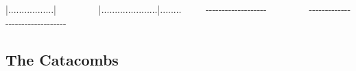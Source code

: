 \allowbreak{}|.................\allowbreak{}|{\mbox{$~$}}{\mbox{$~$}}{\mbox{$~$}}{\mbox{$~$}}{\mbox{$~$}}{\mbox{$~$}}{\mbox{$~$}}{\mbox{$~$}}{\mbox{$~$}}{\mbox{$~$}}{\mbox{$~$}}{\mbox{$~$}}{\mbox{$~$}}{\mbox{$~$}}{\mbox{$~$}}{\mbox{$~$}}{\mbox{$~$}}{\mbox{$~$}}{\mbox{$~$}}{\mbox{$~$}}\allowbreak{}|.....................\allowbreak{}|........{\mbox{$~$}}{\mbox{$~$}}{\mbox{$~$}}{\mbox{$~$}}{\mbox{$~$}}{\mbox{$~$}}{\mbox{$~$}}$\text{ }$\newline{}
-{}-{}-{}-{}-{}-{}-{}-{}-{}-{}-{}-{}-{}-{}-{}-{}-{}-{}-{}{\mbox{$~$}}{\mbox{$~$}}{\mbox{$~$}}{\mbox{$~$}}{\mbox{$~$}}{\mbox{$~$}}{\mbox{$~$}}{\mbox{$~$}}{\mbox{$~$}}{\mbox{$~$}}{\mbox{$~$}}{\mbox{$~$}}{\mbox{$~$}}{\mbox{$~$}}{\mbox{$~$}}{\mbox{$~$}}{\mbox{$~$}}{\mbox{$~$}}{\mbox{$~$}}{\mbox{$~$}}-{}-{}-{}-{}-{}-{}-{}-{}-{}-{}-{}-{}-{}-{}-{}-{}-{}-{}-{}-{}-{}-{}-{}-{}-{}-{}-{}-{}-{}-{}-{}-{}{\mbox{$~$}}{\mbox{$~$}}{\mbox{$~$}}{\mbox{$~$}}{\mbox{$~$}}{\mbox{$~$}}$\text{ }$\newline{}

\subsection{The Catacombs}

